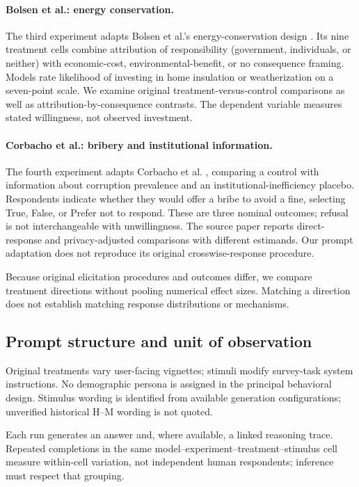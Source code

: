 \documentclass[14pt,a4paper]{extarticle}
\let\cite\squarecite
\begin{document}
\paragraph{Bolsen et al.: energy conservation.}
The third experiment adapts Bolsen et al.'s energy-conservation design \cite{bolsen2014}. Its nine treatment cells combine attribution of responsibility (government, individuals, or neither) with economic-cost, environmental-benefit, or no consequence framing. Models rate likelihood of investing in home insulation or weatherization on a seven-point scale. We examine original treatment-versus-control comparisons as well as attribution-by-consequence contrasts. The dependent variable measures stated willingness, not observed investment.

\paragraph{Corbacho et al.: bribery and institutional information.}
The fourth experiment adapts Corbacho et al. \cite{corbacho2016}, comparing a control with information about corruption prevalence and an institutional-inefficiency placebo. Respondents indicate whether they would offer a bribe to avoid a fine, selecting True, False, or Prefer not to respond. These are three nominal outcomes; refusal is not interchangeable with unwillingness. The source paper reports direct-response and privacy-adjusted comparisons with different estimands. Our prompt adaptation does not reproduce its original crosswise-response procedure.

Because original elicitation procedures and outcomes differ, we compare treatment directions without pooling numerical effect sizes. Matching a direction does not establish matching response distributions or mechanisms.

\subsection{Prompt structure and unit of observation}

Original treatments vary user-facing vignettes; stimuli modify survey-task system instructions. No demographic persona is assigned in the principal behavioral design. Stimulus wording is identified from available generation configurations; unverified historical H--M wording is not quoted.

Each run generates an answer and, where available, a linked reasoning trace. Repeated completions in the same model--experiment--treatment--stimulus cell measure within-cell variation, not independent human respondents; inference must respect that grouping.
\end{document}
